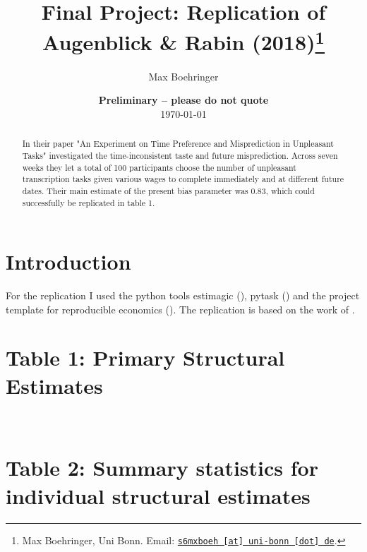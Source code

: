 \documentclass[11pt, a4paper, leqno]{article}
\begin{document}
\title{Final Project: Replication of Augenblick & Rabin (2018)\thanks{Max Boehringer, Uni Bonn. Email: \href{mailto:s6mxboeh@uni-bonn.de}{\nolinkurl{s6mxboeh [at] uni-bonn [dot] de}}.}}

\author{Max Boehringer}

\date{
    {\bf Preliminary -- please do not quote}
    \\[1ex]
    \today
}

\maketitle


\begin{abstract}
In their paper "An Experiment on Time Preference and Misprediction
in Unpleasant Tasks" \citet{augenblick2019experiment} investigated the time-inconsistent taste
and future misprediction. Across seven weeks they let a total of 100 participants choose the
number of unpleasant transcription tasks given various wages to complete immediately
and at different future dates. Their main estimate of the present bias parameter  was 0.83,
which could successfully be replicated in table 1.

\end{abstract}
\clearpage

\section{Introduction} %
\label{sec:introduction}
For the replication I used the python tools estimagic (\citet{Gabler2021}), pytask (\citet{Raabe2020})
and the project template for reproducible economics (\citet{GaudeckerEconProjectTemplates}).
The replication is based on the work of \citet{PozziNunnari}.

\section{Table 1: Primary Structural Estimates}
\label{sec:table1}

\\
\section{Table 2: Summary statistics for individual structural estimates}
\label{sec:table2}

\newpage
\end{document}
